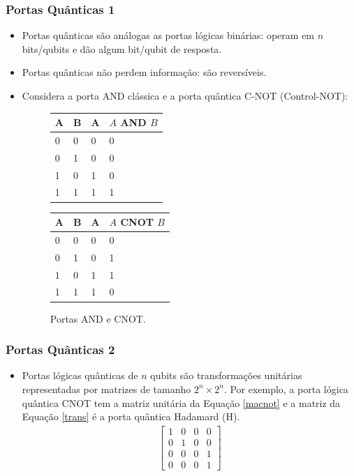 \documentclass{beamer}
\begin{document}
\begin{frame}
\frametitle{Portas Quânticas 1}
\begin{itemize}
  \item Portas quânticas são análogas as portas lógicas binárias: operam
    em $n$ bits/qubits e dão algum bit/qubit de resposta.
  \item Portas quânticas não perdem informação: são reversíveis.
  \item Considera a porta AND clássica e a porta quântica C-NOT (Control-NOT):
    \begin{figure}[!htb]
    \label{andcnot}
    \begin{minipage}{.4\textwidth}
      \centering
      \begin{tabular}{|l l|ll|}
      \hline
      A & B & A & $A$ AND $B$  \\ \hline
      0 & 0 & 0 & 0            \\ \hline
      0 & 1 & 0 & 0            \\ \hline
      1 & 0 & 1 & 0            \\ \hline
      1 & 1 & 1 & 1            \\ \hline
      \end{tabular}
    \end{minipage}
    \begin{minipage}{0.4\textwidth}
      \centering
      \centering
      \begin{tabular}{|l l|ll|}
      \hline
      A & B & A & $A$ CNOT $B$ \\ \hline
      0 & 0 & 0 & 0            \\ \hline
      0 & 1 & 0 & 1            \\ \hline
      1 & 0 & 1 & 1            \\ \hline
      1 & 1 & 1 & 0            \\ \hline
      \end{tabular}
    \end{minipage}
      \caption{Portas AND e CNOT.}
    \end{figure}
\end{itemize}
\end{frame}

\begin{frame}
\frametitle{Portas Quânticas 2}
\begin{itemize}
  \item Portas lógicas quânticas de $n$ qubits são transformações unitárias
    representadas por matrizes de tamanho $2^n \times 2^n$. Por exemplo,
    a porta lógica quântica CNOT tem a matriz unitária da Equação
    \ref{macnot} e a matriz da Equação \ref{trans} é a porta quântica
    Hadamard (H).
    \begin{align}
      \label{macnot}
    \begin{bmatrix} 
    1 & 0 & 0 & 0 \\
    0 & 1 & 0 & 0 \\
    0 & 0 & 0 & 1 \\
    0 & 0 & 0 & 1
    \end{bmatrix}
    \end{align}
\end{itemize}
\end{frame}
\end{document}
